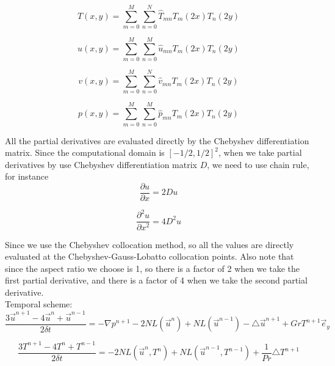 \documentclass[12pt]{article}
\begin{document}
\begin{equation}
T(x,y) =
  \sum_{m=0}^{M}\sum_{n=0}^{N}\hat{T}_{mn}T_{m}(2x)T_{n}(2y)
\end{equation}

\begin{equation}
u(x,y) = 
  \sum_{m=0}^{M}\sum_{n=0}^{M}\hat{u}_{mn}T_{m}(2x)T_{n}(2y)
\end{equation}

\begin{equation}
v(x,y) = 
  \sum_{m=0}^{M}\sum_{n=0}^{N}\hat{v}_{mn}T_{m}(2x)T_{n}(2y)
\end{equation}

\begin{equation}
p(x,y) = 
  \sum_{m=0}^{M}\sum_{n=0}^{M}\hat{p}_{mn}T_{m}(2x)T_{n}(2y)
\end{equation}

All the partial derivatives are evaluated directly by the Chebyshev differentiation matrix. 
Since the computational domain is $[-1/2,1/2]^{2}$, when we take partial derivatives 
by use Chebyshev differentiation matrix $D$, we need to use chain rule, for instance
\begin{equation}
\frac{\partial u}{\partial x} = 2Du
\end{equation}

\begin{equation}
\frac{\partial^{2} u}{\partial x^{2}} = 4D^{2}u
\end{equation}

Since we use the Chebyshev collocation method, so all the values are directly 
evaluated at the Chebyshev-Gauss-Lobatto collocation points. Also note that since 
the aspect ratio we choose is 1, so there is a factor of 2 when we take the first 
partial derivative, and there is a factor of 4 when we take the second partial derivative.\\

Temporal scheme:\\
\begin{equation}
\frac{3\vec{u}^{n+1} - 4\vec{u}^{n} + \vec{u}^{n-1}}{2\delta t} =
- \nabla p^{n+1} - 2NL(\vec{u}^{n})
+ NL(\vec{u}^{n-1}) - \triangle \vec{u}^{n+1} + GrT^{n+1}\vec{e}_{y} 
\end{equation}

\begin{equation}
\frac{3T^{n+1} - 4T^{n}+T^{n-1}}{2\delta t} =
- 2NL(\vec{u}^{n},T^{n})
+  NL(\vec{u}^{n-1},T^{n-1}) + \frac{1}{Pr} \triangle T^{n+1}
\end{equation}
\end{document}
